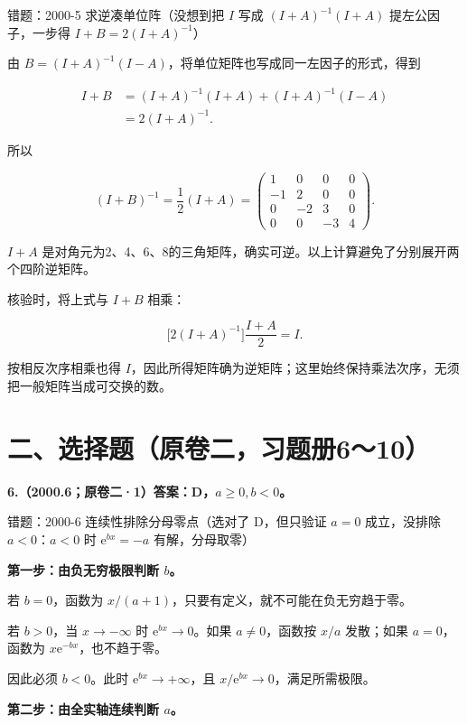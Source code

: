 \documentclass[UTF8,11pt,fontset=windows]{ctexart}
\begin{document}
\begingroup\color{gray}错题：2000-5 求逆凑单位阵（没想到把 $I$ 写成 $(I+A)^{-1}(I+A)$ 提左公因子，一步得 $I+B=2(I+A)^{-1}$）\par\endgroup

由 $B=(I+A)^{-1}(I-A)$，将单位矩阵也写成同一左因子的形式，得到

$$
\begin{aligned}
I+B
&=(I+A)^{-1}(I+A)+(I+A)^{-1}(I-A)\\
&=2(I+A)^{-1}.
\end{aligned}
$$

所以

$$
(I+B)^{-1}=\frac12(I+A)
=\begin{pmatrix}
1&0&0&0\\
-1&2&0&0\\
0&-2&3&0\\
0&0&-3&4
\end{pmatrix}.
$$

$I+A$ 是对角元为2、4、6、8的三角矩阵，确实可逆。以上计算避免了分别展开两个四阶逆矩阵。

核验时，将上式与 $I+B$ 相乘：

$$
\bigl[2(I+A)^{-1}\bigr]\frac{I+A}{2}=I.
$$

按相反次序相乘也得 $I$，因此所得矩阵确为逆矩阵；这里始终保持乘法次序，无须把一般矩阵当成可交换的数。

\clearpage

\section*{二、选择题（原卷二，习题册6～10）}

\textbf{6.（2000.6；原卷二·1）答案：D，$a\ge0,b<0$。}

\begingroup\color{gray}错题：2000-6 连续性排除分母零点（选对了 D，但只验证 $a=0$ 成立，没排除 $a<0$：$a<0$ 时 $\mathrm e^{bx}=-a$ 有解，分母取零）\par\endgroup

\textbf{第一步：由负无穷极限判断 $b$。}

若 $b=0$，函数为 $x/(a+1)$，只要有定义，就不可能在负无穷趋于零。

若 $b>0$，当 $x\to-\infty$ 时 $\mathrm e^{bx}\to0$。如果 $a\ne0$，函数按 $x/a$ 发散；如果 $a=0$，函数为 $x\mathrm e^{-bx}$，也不趋于零。

因此必须 $b<0$。此时 $\mathrm e^{bx}\to+\infty$，且 $x/\mathrm e^{bx}\to0$，满足所需极限。

\textbf{第二步：由全实轴连续判断 $a$。}
\end{document}
